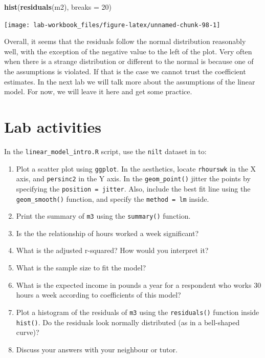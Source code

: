 \documentclass[
]{book}
\newenvironment{Shaded}{\begin{snugshade}}{\end{snugshade}}
\newcommand{\AttributeTok}[1]{\textcolor[rgb]{0.13,0.29,0.53}{#1}}
\newcommand{\DecValTok}[1]{\textcolor[rgb]{0.00,0.00,0.81}{#1}}
\newcommand{\FunctionTok}[1]{\textcolor[rgb]{0.13,0.29,0.53}{\textbf{#1}}}
\newcommand{\NormalTok}[1]{#1}
\providecommand{\tightlist}{%
  \setlength{\itemsep}{0pt}\setlength{\parskip}{0pt}}
\begin{document}
\begin{Shaded}
\begin{Highlighting}[]
\FunctionTok{hist}\NormalTok{(}\FunctionTok{residuals}\NormalTok{(m2), }\AttributeTok{breaks =} \DecValTok{20}\NormalTok{)}
\end{Highlighting}
\end{Shaded}

\begin{flushleft}\texttt{[image: lab-workbook\_files/figure-latex/unnamed-chunk-98-1]} \end{flushleft}

Overall, it seems that the residuals follow the normal distribution reasonably well, with the exception of the negative value to the left of the plot. Very often when there is a strange distribution or different to the normal is because one of the assumptions is violated. If that is the case we cannot trust the coefficient estimates. In the next lab we will talk more about the assumptions of the linear model. For now, we will leave it here and get some practice.

\hypertarget{lab-activities}{%
\section{Lab activities}\label{lab-activities}}

In the \texttt{linear\_model\_intro.R} script, use the \texttt{nilt} dataset in to:

\begin{enumerate}
\def\labelenumi{\arabic{enumi}.}
\tightlist
\item
  Plot a scatter plot using \texttt{ggplot}. In the aesthetics, locate \texttt{rhourswk} in the X axis, and \texttt{persinc2} in the Y axis. In the \texttt{geom\_point()} jitter the points by specifying the \texttt{position\ =\ \textquotesingle{}jitter\textquotesingle{}}. Also, include the best fit line using the \texttt{geom\_smooth()} function, and specify the \texttt{method\ =\ \textquotesingle{}lm\textquotesingle{}} inside.
\item
  Print the summary of \texttt{m3} using the \texttt{summary()} function.
\item
  Is the the relationship of hours worked a week significant?
\item
  What is the adjusted r-squared? How would you interpret it?
\item
  What is the sample size to fit the model?
\item
  What is the expected income in pounds a year for a respondent who works 30 hours a week according to coefficients of this model?
\item
  Plot a histogram of the residuals of \texttt{m3} using the \texttt{residuals()} function inside \texttt{hist()}. Do the residuals look normally distributed (as in a bell-shaped curve)?
\item
  Discuss your answers with your neighbour or tutor.
\end{enumerate}
\end{document}
